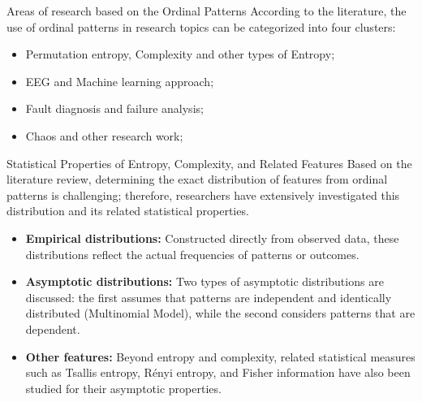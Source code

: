 \documentclass{beamer}
\begin{document}
\begin{frame}{Areas of research based on the Ordinal Patterns}
According to the literature, the use of ordinal patterns in research topics can be categorized into four clusters:
	
	\begin{itemize}
		\item Permutation entropy, Complexity and other types of Entropy;
		\item EEG and Machine learning approach;
		\item Fault diagnosis and failure analysis;
		
		\item Chaos and other research work;
	\end{itemize}
\end{frame}

\begin{frame}{Statistical Properties of Entropy, Complexity, and Related Features}
	Based on the literature review, determining the exact distribution of \alert{features} from ordinal patterns is challenging; therefore, researchers have extensively investigated this distribution and its related statistical properties.
	\begin{itemize}
		\item \textbf{Empirical distributions:} Constructed directly from observed data, these distributions reflect the actual frequencies of patterns or outcomes.
		\item \textbf{Asymptotic distributions:} Two types of asymptotic distributions are discussed: the first assumes that patterns are independent and identically distributed (Multinomial Model), while the second considers patterns that are dependent.
		\item \textbf{Other features:} Beyond entropy and complexity, related statistical measures such as Tsallis entropy, Rényi entropy, and Fisher information have also been studied for their asymptotic properties.
	\end{itemize}
\end{frame}

\end{document}
